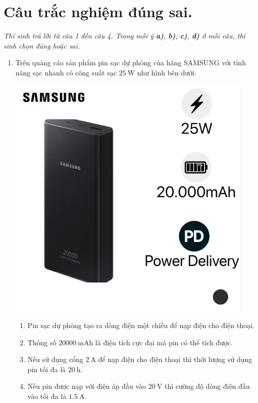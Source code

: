 \section{Câu trắc nghiệm đúng sai.} 
\textit{Thí sinh trả lời từ câu 1 đến câu 4. Trong mỗi ý \textbf{a)}, \textbf{b)}, \textbf{c)}, \textbf{d)} ở mỗi câu, thí sinh chọn đúng hoặc sai.}
\begin{enumerate}[label=\bfseries Câu \arabic*:]
	\item Trên quảng cáo sản phẩm pin sạc dự phòng của hãng SAMSUNG với tính năng sạc nhanh có công suất sạc $\SI{25}{\watt}$ như hình bên dưới.
	\begin{center}
		\includegraphics[width=0.4\linewidth]{../figs/PH11-FinalSem2-01-5}
	\end{center}
	\begin{enumerate}[label=\alph*)]
		\item Pin sạc dự phòng tạo ra dòng điện một chiều để nạp điện cho điện thoại.
		\item Thông số $\SI{20000}{\milli\ampere\hour}$ là điện tích cực đại mà pin có thể tích được.
		\item Nếu sử dụng cổng $\SI{2}{\ampere}$ để nạp điện cho điện thoại thì thời lượng sử dụng pin tối đa là $\SI{20}{\hour}$.
		\item Nếu pin được nạp với điện áp đầu vào $\SI{20}{\volt}$ thì cường độ dòng điện đầu vào tối đa là $\SI{1.5}{\ampere}$.
	\end{enumerate}
	

\end{enumerate}

